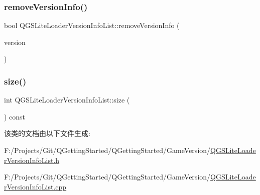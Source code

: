 \subsubsection{\texorpdfstring{remove\+Version\+Info()}{removeVersionInfo()}}
{\footnotesize\ttfamily bool Q\+G\+S\+Lite\+Loader\+Version\+Info\+List\+::remove\+Version\+Info (\begin{DoxyParamCaption}\item[{const Q\+String \&}]{version }\end{DoxyParamCaption})}

\mbox{\label{class_q_g_s_lite_loader_version_info_list_aadc71fa7e8aeba54200a49da39e773eb}} 
\subsubsection{\texorpdfstring{size()}{size()}}
{\footnotesize\ttfamily int Q\+G\+S\+Lite\+Loader\+Version\+Info\+List\+::size (\begin{DoxyParamCaption}{ }\end{DoxyParamCaption}) const}



该类的文档由以下文件生成\+:\begin{DoxyCompactItemize}
\item 
F\+:/\+Projects/\+Git/\+Q\+Getting\+Started/\+Q\+Getting\+Started/\+Game\+Version/\mbox{\hyperlink{_q_g_s_lite_loader_version_info_list_8h}{Q\+G\+S\+Lite\+Loader\+Version\+Info\+List.\+h}}\item 
F\+:/\+Projects/\+Git/\+Q\+Getting\+Started/\+Q\+Getting\+Started/\+Game\+Version/\mbox{\hyperlink{_q_g_s_lite_loader_version_info_list_8cpp}{Q\+G\+S\+Lite\+Loader\+Version\+Info\+List.\+cpp}}\end{DoxyCompactItemize}

